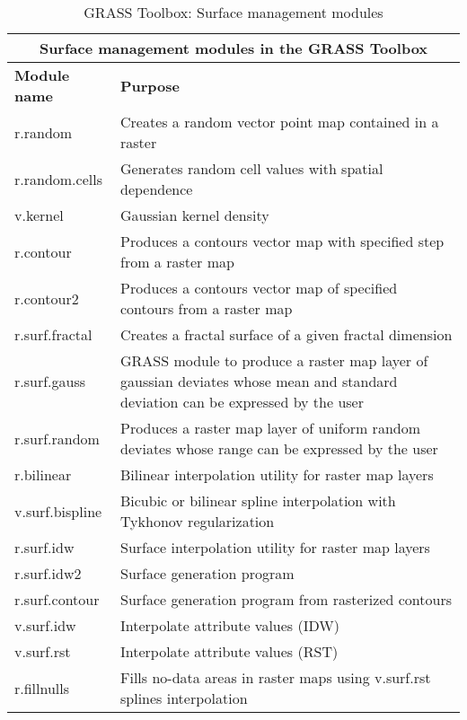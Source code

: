 \begin{table}[ht]
\centering
\caption{GRASS Toolbox: Surface management modules}\medskip
 \begin{tabular}{|p{4cm}|p{12cm}|}
  \hline \multicolumn{2}{|c|}{\textbf{Surface management modules in the GRASS
  Toolbox}} \\
  \hline \textbf{Module name} & \textbf{Purpose} \\
  \hline r.random & Creates a random vector point map contained in a raster \\
  \hline r.random.cells & Generates random cell values with spatial
  dependence \\
  \hline v.kernel & Gaussian kernel density \\
  \hline r.contour & Produces a contours vector map with specified step from
  a raster map\\
  \hline r.contour2 & Produces a contours vector map of specified contours
  from a raster map \\
  \hline r.surf.fractal & Creates a fractal surface of a given fractal
  dimension\\
  \hline r.surf.gauss & GRASS module to produce a raster map layer of
  gaussian deviates whose mean and standard deviation can be expressed by the
  user \\
  \hline r.surf.random & Produces a raster map layer of uniform random
  deviates whose range can be expressed by the user \\
  \hline r.bilinear & Bilinear interpolation utility for raster map layers \\
  \hline v.surf.bispline & Bicubic or bilinear spline interpolation with
  Tykhonov regularization\\
  \hline r.surf.idw & Surface interpolation utility for raster map layers\\
  \hline r.surf.idw2 & Surface generation program\\
  \hline r.surf.contour & Surface generation program from rasterized contours \\
  \hline v.surf.idw & Interpolate attribute values (IDW) \\
  \hline v.surf.rst & Interpolate attribute values (RST) \\
  \hline r.fillnulls & Fills no-data areas in raster maps using v.surf.rst
  splines interpolation \\
\hline
\end{tabular}
\end{table}

